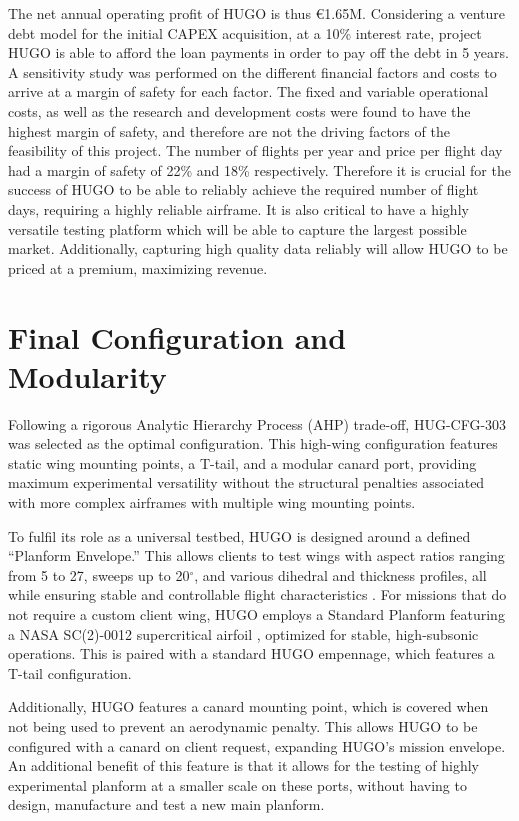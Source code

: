 The net annual operating profit of HUGO is thus €1.65M. Considering a venture debt model for the initial CAPEX acquisition, at a 10\% interest rate, project HUGO is able to afford the loan payments in order to pay off the debt in 5 years. A sensitivity study was performed on the different financial factors and costs to arrive at a margin of safety for each factor. The fixed and variable operational costs, as well as the research and development costs were found to have the highest margin of safety, and therefore are not the driving factors of the feasibility of this project. The number of flights per year and price per flight day had a margin of safety of 22\% and 18\% respectively. Therefore it is crucial for the success of HUGO to be able to reliably achieve the required number of flight days, requiring a highly reliable airframe. It is also critical to have a highly versatile testing platform which will be able to capture the largest possible market. Additionally, capturing high quality data reliably will allow HUGO to be priced at a premium, maximizing revenue.


\section*{Final Configuration and Modularity}
\label{sec:exec-final_configuration}

Following a rigorous Analytic Hierarchy Process (AHP) trade-off, HUG-CFG-303 was selected as the optimal configuration. This high-wing configuration features static wing mounting points, a T-tail, and a modular canard port, providing maximum experimental versatility without the structural penalties associated with more complex airframes with multiple wing mounting points. 

To fulfil its role as a universal testbed, HUGO is designed around a defined ``Planform Envelope.'' This allows clients to test wings with aspect ratios ranging from 5 to 27, sweeps up to 20$^{\circ}$, and various dihedral and thickness profiles, all while ensuring stable and controllable flight characteristics \cite{nelson1998flight}. For missions that do not require a custom client wing, HUGO employs a Standard Planform featuring a NASA SC(2)-0012 supercritical airfoil \cite{Harris1990}, optimized for stable, high-subsonic operations. This is paired with a standard HUGO empennage, which features a T-tail configuration. 

Additionally, HUGO features a canard mounting point, which is covered when not being used to prevent an aerodynamic penalty. This allows HUGO to be configured with a canard on client request, expanding HUGO's mission envelope. An additional benefit of this feature is that it allows for the testing of highly experimental planform at a smaller scale on these ports, without having to design, manufacture and test a new main planform.

